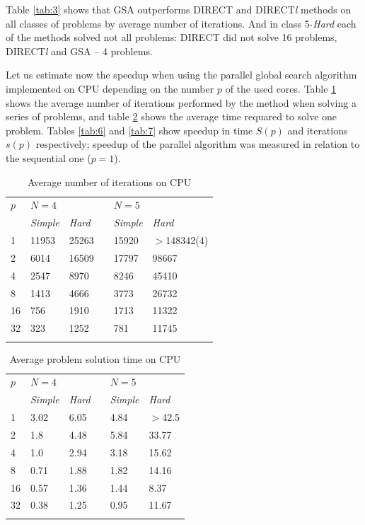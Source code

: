 \documentclass[smallcondensed]{svjour3}     %
\begin{document}
Table \ref{tab:3} shows that GSA outperforms DIRECT and DIRECT\textit{l} methods on all classes of problems by average number of iterations. And in class 5-\textit{Hard} each of the methods solved not all problems: DIRECT did not solve 16 problems, DIRECT\textit{l} and GSA -- 4 problems.

Let us estimate now the speedup when using the parallel global search algorithm implemented on CPU depending on the number $p$ of the used cores. Table \ref{tab:4} shows the average number of iterations performed by the method when solving a series of problems, and table \ref{tab:5} shows the average time requared to solve one problem. Tables \ref{tab:6} and \ref{tab:7} show speedup in time $S(p)$ and iterations $s(p)$ respectively; speedup of the parallel algorithm was measured in relation to the sequential one ($p=1$).

\begin{table}
	\caption{Average number of iterations on CPU}
	\label{tab:4}
	\center
	\begin{tabular}{llllll}
		\hline\noalign{\smallskip}
		$p$ & \multicolumn{2}{l}{ $N=4$ } & & \multicolumn{2}{l}{$N=5$} \\
		\noalign{\smallskip} \cline{2-3} \cline{5-6} \noalign{\smallskip}
		 & \textit{Simple} & \textit{Hard} & & \textit{Simple} & \textit{Hard}  \\
		\noalign{\smallskip} \hline \noalign{\smallskip}
		1 &	11953 &	25263 & &	15920 &	$>$148342(4) \\
		2 &	6014 &	16509 & & 17797 &	98667 \\
		4 &	2547 &	8970 & &	8246 &	45410 \\
		8 &	1413 &	4666 & &	3773 &	26732 \\
		16 &	756 &	1910 & &	1713 &	11322 \\
		32 &	323 &	1252 & &	781 &	11745 \\
		\noalign{\smallskip}\hline
	\end{tabular}
\end{table}

\begin{table}
	\caption{Average problem solution time on CPU}
	\label{tab:5}
	\center
	\begin{tabular}{llllll}
		\hline\noalign{\smallskip}
		$p$ & \multicolumn{2}{l}{ $N=4$ } & & \multicolumn{2}{l}{$N=5$} \\
		\noalign{\smallskip} \cline{2-3} \cline{5-6} \noalign{\smallskip}
		 & \textit{Simple} & \textit{Hard} & & \textit{Simple} & \textit{Hard}  \\
		\noalign{\smallskip} \hline \noalign{\smallskip}
		1 &	3.02 &	6.05 & &	4.84 &	$>$42.5 \\
		2 &	1.8 &	4.48 & &	5.84 &	33.77 \\
		4 &	1.0 &	2.94 & &	3.18 &	15.62 \\
		8 &	0.71 &	1.88 & &	1.82 &	14.16 \\
		16 &	0.57 &	1.36 & &	1.44 &	8.37 \\
		32 &	0.38 &	1.25 & &	0.95 &	11.67 \\
		\noalign{\smallskip}\hline
	\end{tabular}
\end{table}
\end{document}
